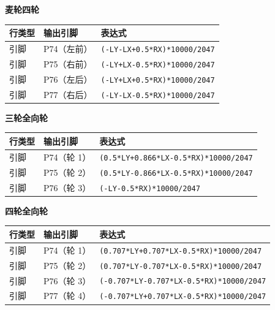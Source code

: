 \noindent\textbf{麦轮四轮}

\begin{center}
  \footnotesize
  \setlength{\tabcolsep}{4pt}
  \begin{tabularx}{\linewidth}{@{}l l X@{}}
    \toprule
    行类型 & 输出引脚 & 表达式 \\
    \midrule
    引脚 & P74（左前） & \texttt{(-LY-LX+0.5*RX)*10000/2047} \\
    引脚 & P75（右前） & \texttt{(-LY+LX-0.5*RX)*10000/2047} \\
    引脚 & P76（左后） & \texttt{(-LY+LX+0.5*RX)*10000/2047} \\
    引脚 & P77（右后） & \texttt{(-LY-LX-0.5*RX)*10000/2047} \\
    \bottomrule
  \end{tabularx}
\end{center}

\noindent\textbf{三轮全向轮}

\begin{center}
  \footnotesize
  \setlength{\tabcolsep}{4pt}
  \begin{tabularx}{\linewidth}{@{}l l X@{}}
    \toprule
    行类型 & 输出引脚 & 表达式 \\
    \midrule
    引脚 & P74（轮 1） & \texttt{(0.5*LY+0.866*LX-0.5*RX)*10000/2047} \\
    引脚 & P75（轮 2） & \texttt{(0.5*LY-0.866*LX-0.5*RX)*10000/2047} \\
    引脚 & P76（轮 3） & \texttt{(-LY-0.5*RX)*10000/2047} \\
    \bottomrule
  \end{tabularx}
\end{center}

\noindent\textbf{四轮全向轮}

\begin{center}
  \footnotesize
  \setlength{\tabcolsep}{4pt}
  \begin{tabularx}{\linewidth}{@{}l l X@{}}
    \toprule
    行类型 & 输出引脚 & 表达式 \\
    \midrule
    引脚 & P74（轮 1） & \texttt{(0.707*LY+0.707*LX-0.5*RX)*10000/2047} \\
    引脚 & P75（轮 2） & \texttt{(0.707*LY-0.707*LX-0.5*RX)*10000/2047} \\
    引脚 & P76（轮 3） & \texttt{(-0.707*LY-0.707*LX-0.5*RX)*10000/2047} \\
    引脚 & P77（轮 4） & \texttt{(-0.707*LY+0.707*LX-0.5*RX)*10000/2047} \\
    \bottomrule
  \end{tabularx}
\end{center}


